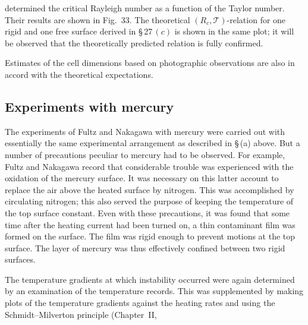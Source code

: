 
\noindent determined the critical Rayleigh number as a function of the Taylor
number.  Their results are shown in Fig.~33.  The theoretical $(R_c, \mathscr{T})$-relation
for one rigid and one free surface derived in \S\,27\,$(c)$ is shown in
the same plot; it will be observed that the theoretically predicted relation
is fully confirmed.

Estimates of the cell dimensions based on photographic observations
are also in accord with the theoretical expectations.

\subsection{Experiments with mercury}
\label{sec:35b}

The experiments of Fultz and Nakagawa with mercury were carried
out with essentially the same experimental arrangement as described
in \S\,(a) above.  But a number of precautions peculiar to mercury had to
be observed.  For example, Fultz and Nakagawa record that considerable
trouble was experienced with the oxidation of the mercury surface.  It
was necessary on this latter account to replace the air above the heated
surface by nitrogen.  This was accomplished by circulating nitrogen;
this also served the purpose of keeping the temperature of the top surface
constant.  Even with these precautions, it was found that some time after
the heating current had been turned on, a thin contaminant film was
formed on the surface.  The film was rigid enough to prevent motions at
the top surface.  The layer of mercury was thus effectively confined
between two rigid surfaces.

The temperature gradients at which instability occurred were again
determined by an examination of the temperature records.  This was
supplemented by making plots of the temperature gradients against the
heating rates and using the Schmidt--Milverton principle (Chapter~II,

